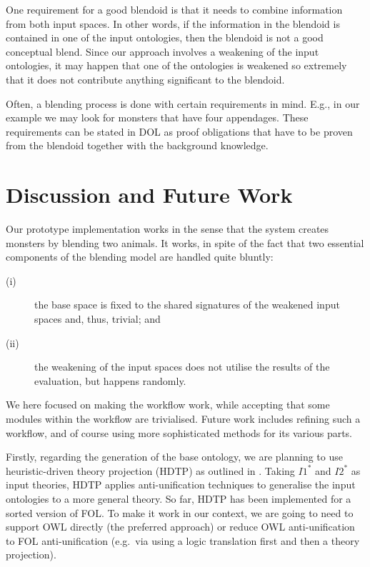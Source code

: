 \documentclass{ecai2012}
\begin{document}
One requirement for a good blendoid is that it needs to combine information from 
both input spaces. In other words, if the information in the blendoid is contained
 in one of the input ontologies, then the blendoid is not a good conceptual blend. 
 Since our approach involves a weakening of the input ontologies, it may happen 
 that one of the ontologies is weakened so extremely that it does not contribute   
 anything significant to the blendoid. 


Often, a blending process is done with certain requirements in mind. E.g., 
in our example we may look for monsters that have four appendages. 
These requirements can be stated in DOL as proof obligations that have to 
be proven from the blendoid together with the background knowledge. 


\section{Discussion and Future Work}

Our prototype implementation works in the sense that the system creates monsters by blending two animals.
 It works, in spite of the fact that two essential components of the blending model are handled quite bluntly: 
 
 \begin{description}
\item[(i)] the base space is fixed to the shared signatures of the weakened input spaces and, thus,  trivial; and
\item[(ii)] the weakening of the input spaces does not utilise the results of the evaluation, but happens randomly. 
\end{description}

We here  focused on making the workflow work, while accepting that some modules within the workflow are trivialised. 
Future work includes refining such a workflow, and of course using more sophisticated methods for its various parts. 

Firstly, regarding the generation of the base ontology, we are planning to use heuristic-driven theory projection (HDTP) as outlined in \cite{Martinezetal2011,schweringEtAl09}. Taking $I1^*$ and $I2^*$ as input theories, HDTP  applies anti-unification techniques to generalise the input ontologies to a more general theory. So far, HDTP has been implemented for a sorted version of FOL. To make it work in our context, we are going to need to support OWL directly (the preferred approach) or reduce OWL anti-unification to FOL anti-unification (e.g.\ via using a logic translation first and then a theory projection).  
\end{document}
